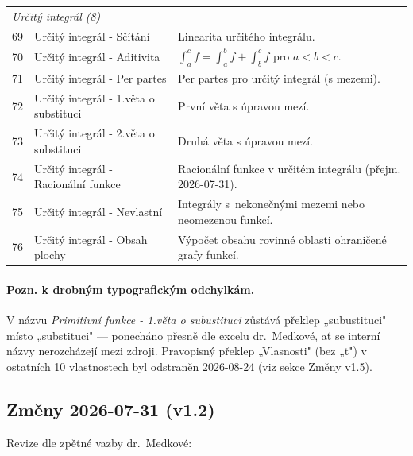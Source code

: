 \documentclass[11pt,a4paper]{article}
\begin{document}
\begin{longtable}{p{1cm}p{6cm}p{8.5cm}}
  \multicolumn{3}{l}{\textit{Určitý integrál (8)}} \\[2pt]
  69 & Určitý integrál - Sčítání               & Linearita určitého integrálu. \\
  70 & Určitý integrál - Aditivita             & $\int_a^c f = \int_a^b f + \int_b^c f$ pro $a<b<c$. \\
  71 & Určitý integrál - Per partes            & Per partes pro určitý integrál (s mezemi). \\
  72 & Určitý integrál - 1.věta o substituci   & První věta s úpravou mezí. \\
  73 & Určitý integrál - 2.věta o substituci   & Druhá věta s úpravou mezí. \\
  74 & Určitý integrál - Racionální funkce     & Racionální funkce v určitém integrálu (přejm. 2026-07-31). \\
  75 & Určitý integrál - Nevlastní             & Integrály s~nekonečnými mezemi nebo neomezenou funkcí. \\
  76 & Určitý integrál - Obsah plochy          & Výpočet obsahu rovinné oblasti ohraničené grafy funkcí. \\
  \bottomrule
\end{longtable}

\paragraph{Pozn. k drobným typografickým odchylkám.} V názvu \emph{Primitivní funkce - 1.věta o subustituci} zůstává překlep „subustituci" místo „substituci" --- ponecháno přesně dle excelu dr.~Medkové, ať se interní názvy nerozcházejí mezi zdroji. Pravopisný překlep „Vlasnosti" (bez „t") v ostatních 10 vlastnostech byl odstraněn 2026-08-24 (viz sekce Změny v1.5).

\subsection{Změny 2026-07-31 (v1.2)}

Revize dle zpětné vazby dr.~Medkové:
\end{document}
